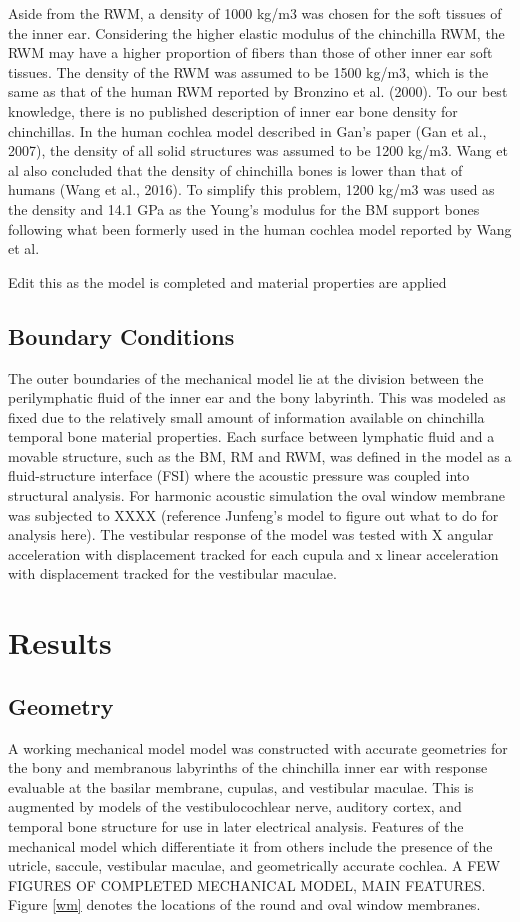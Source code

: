 \documentclass[12pt]{article}
\begin{document}
Aside from the RWM, a density of 1000 kg/m3 was chosen for the soft tissues of the inner ear. Considering the higher elastic modulus of the chinchilla RWM, the RWM may have a higher proportion of fibers than those of other inner ear soft tissues. The density of the RWM was assumed to be 1500 kg/m3, which is the same as that of the human RWM reported by Bronzino et al. (2000). To our best knowledge, there is no published description of inner ear bone density for chinchillas. In the human cochlea model described in Gan’s paper (Gan et al., 2007), the density of all solid structures was assumed to be 1200 kg/m3. Wang et al also concluded that the density of chinchilla bones is lower than that of humans (Wang et al., 2016). To simplify this problem, 1200 kg/m3 was used as the density and 14.1 GPa as the Young’s modulus for the BM support bones following what been formerly used in the human cochlea model reported by Wang et al.

Edit this as the model is completed and material properties are applied


\subsection{Boundary Conditions}
The outer boundaries of the mechanical model lie at the division between the perilymphatic fluid of the inner ear and the bony labyrinth. This was modeled as fixed due to the relatively small amount of information available on chinchilla temporal bone material properties. Each surface between lymphatic fluid and a movable structure, such as the BM, RM and RWM, was defined in the model as a fluid-structure interface (FSI) where the acoustic pressure was coupled into structural analysis. For harmonic acoustic simulation the oval window membrane was subjected to XXXX (reference Junfeng's model to figure out what to do for analysis here). The vestibular response of the model was tested with X angular acceleration with displacement tracked for each cupula and x linear acceleration with displacement tracked for the vestibular maculae.



\section{Results}
\subsection{Geometry}
A working mechanical model model was constructed with accurate geometries for the bony and membranous labyrinths of the chinchilla inner ear with response evaluable at the basilar membrane, cupulas, and vestibular maculae. This is augmented by models of the vestibulocochlear nerve, auditory cortex, and temporal bone structure for use in later electrical analysis. Features of the mechanical model which differentiate it from others include the presence of the utricle, saccule, vestibular maculae, and geometrically accurate cochlea. A FEW FIGURES OF COMPLETED MECHANICAL MODEL, MAIN FEATURES. Figure \ref{wm} denotes the locations of the round and oval window membranes.
\end{document}
